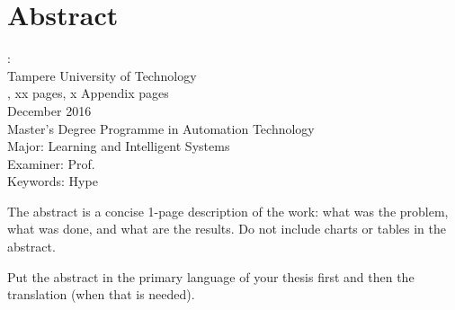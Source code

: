 \documentclass[12pt,a4paper,english
]{tutthesis}
\begin{document}
\chapter*{Abstract}

\begin{spacing}{1.0}
         {\bf \textsf{\MakeUppercase{\@author}}}: \@title\\   %
         \textsf{Tampere University of Technology}\\
         \textsf{\@thesistype, xx pages, x Appendix pages} \\
         \textsf{December 2016}\\
         \textsf{Master's Degree Programme in Automation Technology}\\
         \textsf{Major: Learning and Intelligent Systems}\\
         \textsf{Examiner: Prof. \@examiner}\\ %
         \textsf{Keywords: Hype}\\
\end{spacing}


The abstract is a concise 1-page description of the work: what was the
problem, what was done, and what are the results. Do not include
charts or tables in the abstract.

Put the abstract in the primary language of your thesis first and then
the translation (when that is needed).


\end{document}
